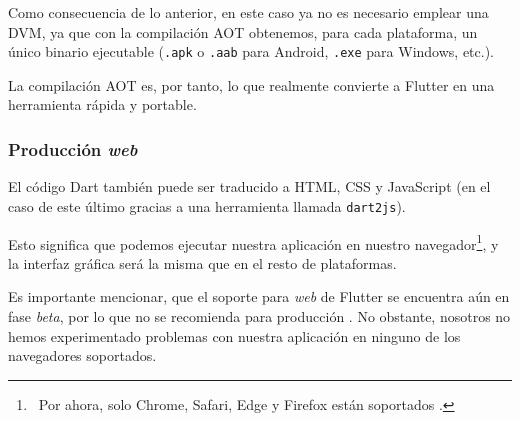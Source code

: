 Como consecuencia de lo anterior, en este caso ya no es necesario emplear una DVM, ya que con la compilación AOT obtenemos, para cada plataforma, un único binario ejecutable (\texttt{.apk} o \texttt{.aab} para Android, \texttt{.exe} para Windows, etc.).

La compilación AOT es, por tanto, lo que realmente convierte a Flutter en una herramienta rápida y portable.

\subsubsection{Producción \emph{web}}

El código Dart también puede ser traducido a HTML, CSS y JavaScript (en el caso de este último gracias a una herramienta llamada \texttt{dart2js}).

Esto significa que podemos ejecutar nuestra aplicación en nuestro navegador\footnote{\, Por ahora, solo Chrome, Safari, Edge y Firefox están soportados \cite{flutter-web}.}, y la interfaz gráfica será la misma que en el resto de plataformas.

Es importante mencionar, que el soporte para \emph{web} de Flutter se encuentra aún en fase \emph{beta}, por lo que no se recomienda para producción \cite{flutter-web}. No obstante, nosotros no hemos experimentado problemas con nuestra aplicación en ninguno de los navegadores soportados.